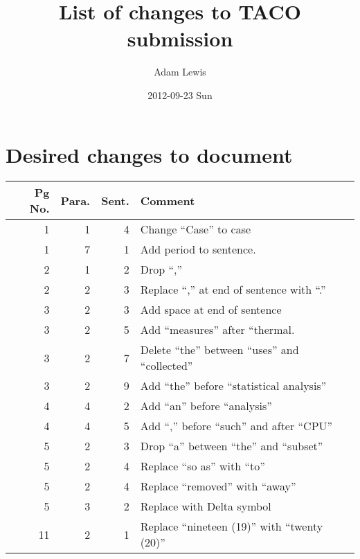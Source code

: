 \documentclass[11pt]{article}
\title{List of changes to TACO submission}
\author{Adam Lewis}
\date{2012-09-23 Sun}
\begin{document}
\maketitle

\setcounter{tocdepth}{3}
\tableofcontents
\vspace*{1cm}
\section{Desired changes to document}
\label{sec-1}


\begin{center}
\begin{tabular}{rrrl}
\hline
 Pg No.  &  Para.  &  Sent.  &  Comment                                            \\
\hline
      1  &      1  &      4  &  Change ``Case'' to case                            \\
      1  &      7  &      1  &  Add period to sentence.                            \\
\hline
      2  &      1  &      2  &  Drop ``,''                                         \\
      2  &      2  &      3  &  Replace ``,'' at end of sentence with ``.''        \\
\hline
      3  &      2  &      3  &  Add space at end of sentence                       \\
      3  &      2  &      5  &  Add ``measures'' after ``thermal.                  \\
      3  &      2  &      7  &  Delete ``the'' between ``uses'' and ``collected''  \\
      3  &      2  &      9  &  Add ``the'' before ``statistical analysis''        \\
\hline
      4  &      4  &      2  &  Add ``an'' before ``analysis''                     \\
      4  &      4  &      5  &  Add ``,'' before ``such'' and after ``CPU''        \\
\hline
      5  &      2  &      3  &  Drop ``a'' between ``the'' and ``subset''          \\
      5  &      2  &      4  &  Replace ``so as'' with ``to''                      \\
      5  &      2  &      4  &  Replace ``removed'' with ``away''                  \\
      5  &      3  &      2  &  Replace with Delta symbol                          \\
\hline
     11  &      2  &      1  &  Replace ``nineteen (19)'' with ``twenty (20)''     \\
\hline
\end{tabular}
\end{center}
\end{document}
